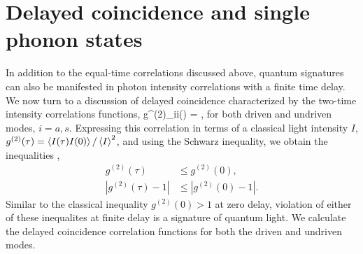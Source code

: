 \section{Delayed coincidence and single phonon states}
\label{sect:Delayed_coincidence}

In addition to the equal-time correlations discussed above,
quantum signatures can also be manifested in photon
intensity correlations with a finite time delay.
We now turn to a discussion of  delayed coincidence
characterized by the 
two-time
intensity correlations functions,
\bel
\label{eq:g2_tau}
	g^{(2)}_{ii}(\tau) = ,
\eel
for both driven and undriven modes, $i = a,s$.
Expressing this correlation in terms of a classical
light intensity $I$,
$g^{(2)}(\tau) = \left<  I(\tau) I(0)  \right> / \left<  I  \right>^2$,
and
using the Schwarz inequality, we
obtain the inequalities \cite{Carmichael1991, Brecha1999},
\begin{align}
  \label{eq:classical_criterium}
 	g^{(2)}(\tau) &\leq g^{(2)}(0),	%
	\\
	 |g^{(2)}(\tau)-1| & \leq |g^{(2)}(0)-1| .%
\end{align}
Similar to the classical inequality
$g^{(2)}(0) > 1$ at zero delay, 
violation of either of these inequalites
at finite delay is
a signature of quantum light. 
We calculate the delayed coincidence correlation
functions
for both the driven and undriven modes.


